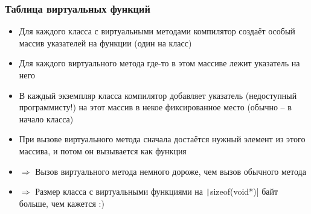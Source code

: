 \documentclass[10pt]{beamer}
\begin{document}
\begin{frame}[fragile]
\frametitle{Таблица виртуальных функций}
\begin{itemize}
\item Для каждого класса с виртуальными методами компилятор создаёт особый массив указателей на функции (один на класс)
\pause
\item Для каждого виртуального метода где-то в этом массиве лежит указатель на него
\pause
\item В каждый экземпляр класса компилятор добавляет указатель (недоступный программисту!) на этот массив в некое фиксированное место (обычно -- в начало класса)
\pause
\item При вызове виртуального метода сначала достаётся нужный элемент из этого массива, и потом он вызывается как функция
\pause
\item \(\Longrightarrow\) Вызов виртуального метода немного дороже, чем вызов обычного метода
\pause
\item \(\Longrightarrow\) Размер класса с виртуальными функциями на \texttt|sizeof(void*)| байт больше, чем кажется :)
\end{itemize}
\end{frame}
\end{document}

